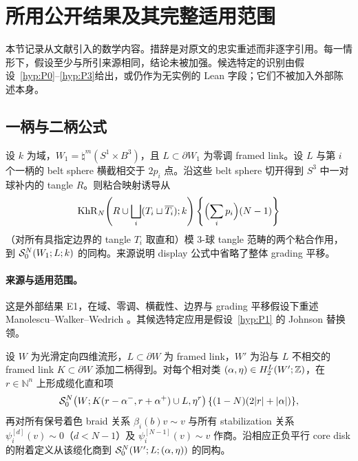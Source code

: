 \section{所用公开结果及其完整适用范围}\label{sec:published-results}

本节记录从文献引入的数学内容。措辞是对原文的忠实重述而非逐字引用。每一情形下，假设至少与所引来源相同，结论未被加强。候选特定的识别由假设~\ref{hyp:P0}--\ref{hyp:P3}给出，或仍作为无实例的 Lean 字段；它们不被加入外部陈述本身。

\subsection{一柄与二柄公式}

\begin{externalresult}[MWW 定理 4.7]\label{prop:mww-4.7}
设 $k$ 为域，$W_1=\natural^m(S^1\times B^3)$，且 $L\subset\partial W_1$ 为零调 framed link。设 $L$ 与第 $i$ 个一柄的 belt sphere 横截相交于 $2p_i$ 点。沿这些 belt sphere 切开得到 $S^3$ 中一对球补内的 tangle $R$。则粘合映射诱导从
\[
 \operatorname{KhR}_N\!\left(R\cup\bigsqcup_i(T_i\sqcup\overline{T_i});k\right)
 \left\{\Bigl(\sum_i p_i\Bigr)(N-1)\right\}
\]
（对所有具指定边界的 tangle $T_i$ 取直和）模 $3$-球 tangle 范畴的两个粘合作用，到 $\mathcal{S}^{N}_{0}(W_1;L;k)$ 的同构。来源说明 display 公式中省略了整体 grading 平移。
\end{externalresult}

\paragraph{来源与适用范围。}
这是外部结果 E1，在域、零调、横截性、边界与 grading 平移假设下重述 Manolescu--Walker--Wedrich \cite[Theorem~4.7]{ManolescuWalkerWedrich2023}。其候选特定应用是假设~\ref{hyp:P1} 的 Johnson 替换领。

\begin{externalresult}\label{prop:mww-3.2}
设 $W$ 为光滑定向四维流形，$L\subset\partial W$ 为 framed link，$W'$ 为沿与 $L$ 不相交的 framed link $K\subset\partial W$ 添加二柄得到。对每个相对类 $(\alpha,\eta)\in H_2^L(W';\mathbb{Z})$，在 $r\in\mathbb N^n$ 上形成缆化直和项
\[
 \mathcal{S}^{N}_{0}\!\left(W;K(r-\alpha^-,r+\alpha^+)\cup L,\eta^r\right)
 \{(1-N)(2|r|+|\alpha|)\},
\]
再对所有保号着色 braid 关系 $\beta_i(b)v\sim v$ 与所有 stabilization 关系 $\psi_i^{[d]}(v)\sim0$（$d<N-1$）及 $\psi_i^{[N-1]}(v)\sim v$ 作商。沿相应正负平行 core disk 的附着定义从该缆化商到 $\mathcal{S}^{N}_{0}(W';L;(\alpha,\eta))$ 的同构。
\end{externalresult}

